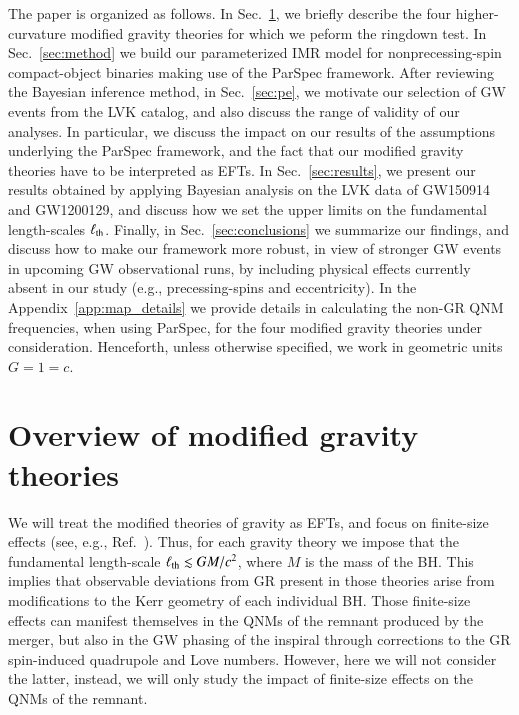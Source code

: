 \documentclass[twocolumn,
               prd,
               aps,
               superscriptaddress,
               tightenlines,
               nofootinbib,
               eqsecnum,
               amsfonts,
               amsmath,
               longbibliography]{revtex4-1}
\begin{document}
The paper is organized as follows. In Sec.~\ref{sec:review_theories}, we briefly describe the four
higher-curvature modified gravity theories for which we peform the ringdown test.
In Sec.~\ref{sec:method} we build our parameterized IMR model for nonprecessing-spin compact-object
binaries making use of the ParSpec framework. After reviewing the Bayesian inference method,
in Sec.~\ref{sec:pe}, we motivate our selection of GW events from the LVK catalog, and also
discuss the range of validity of our analyses. In particular, we discuss the impact on
our results of the assumptions underlying the ParSpec framework, and the fact that
our modified gravity theories have to be interpreted as EFTs. In Sec.~\ref{sec:results},
we present our results obtained by applying Bayesian analysis on the LVK data of
GW150914 and GW1200129, and discuss how we set the upper limits
on the fundamental length-scales $\ell_{\rm th}$. Finally, in Sec.~\ref{sec:conclusions} we
summarize our findings, and discuss how to make our framework more robust, in view
of stronger GW events in upcoming GW observational runs, by including  physical effects currently absent in our
study (e.g., precessing-spins and eccentricity). In the Appendix~\ref{app:map_details}
we provide details in calculating the non-GR QNM frequencies, when using ParSpec,
for the four modified gravity theories under consideration.
%
Henceforth, unless otherwise specified, we work in geometric units $G = 1 = c$.

\section{Overview of modified gravity theories}
\label{sec:review_theories}


We will treat the modified theories of gravity as EFTs, and focus on
finite-size effects (see, e.g., Ref.~\cite{Sennett:2019bpc}). Thus, for each gravity theory we impose that
the fundamental length-scale $\ell_{\rm th} \lesssim GM/c^2$, where $M$ is the mass of the BH. This implies
that observable deviations from GR present in those theories arise from modifications
to the Kerr geometry of each individual BH. Those finite-size effects can manifest themselves in
the QNMs of the remnant produced by the merger, but also in the GW phasing of the inspiral through
corrections to the GR spin-induced quadrupole and Love numbers. However, here we will not consider the latter,
instead, we will only study the impact of finite-size effects on the QNMs of the
remnant.
\end{document}
